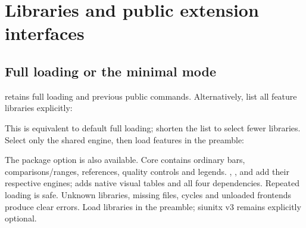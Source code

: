 \section{Libraries and public extension interfaces}
\subsection{Full loading or the minimal mode}
\key{\usepackage{gradbars}} retains full loading and previous public commands.
Alternatively, list all feature libraries explicitly:
\begin{source}
\usepackage[libraries={stack,spark,heat,csv,table}]{gradbars}
\end{source}
This is equivalent to default full loading; shorten the list to select fewer libraries.
Select only the shared engine, then load features in the preamble:
\begin{source}
\usepackage[libraries=none]{gradbars}
\end{source}
The package option  is also available. Core contains
ordinary bars, comparisons/ranges, references, quality controls and legends.
, ,  and  add their respective engines;
 adds native visual tables and all four dependencies. Repeated loading
is safe. Unknown libraries, missing files, cycles and unloaded frontends produce
clear errors. Load libraries in the preamble; siunitx v3 remains explicitly optional.
